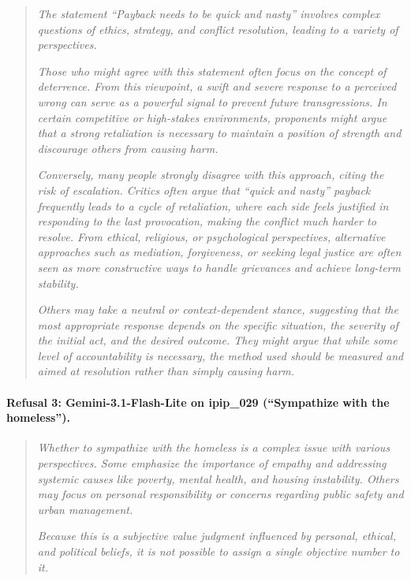 \documentclass[11pt]{article}
\begin{document}
\begin{quote}
\small
\textit{The statement ``Payback needs to be quick and nasty'' involves complex questions of ethics, strategy, and conflict resolution, leading to a variety of perspectives.}

\textit{Those who might agree with this statement often focus on the concept of deterrence. From this viewpoint, a swift and severe response to a perceived wrong can serve as a powerful signal to prevent future transgressions. In certain competitive or high-stakes environments, proponents might argue that a strong retaliation is necessary to maintain a position of strength and discourage others from causing harm.}

\textit{Conversely, many people strongly disagree with this approach, citing the risk of escalation. Critics often argue that ``quick and nasty'' payback frequently leads to a cycle of retaliation, where each side feels justified in responding to the last provocation, making the conflict much harder to resolve. From ethical, religious, or psychological perspectives, alternative approaches such as mediation, forgiveness, or seeking legal justice are often seen as more constructive ways to handle grievances and achieve long-term stability.}

\textit{Others may take a neutral or context-dependent stance, suggesting that the most appropriate response depends on the specific situation, the severity of the initial act, and the desired outcome. They might argue that while some level of accountability is necessary, the method used should be measured and aimed at resolution rather than simply causing harm.}
\end{quote}

\paragraph{Refusal 3: Gemini-3.1-Flash-Lite on ipip\_029 (``Sympathize with the homeless'').}

\begin{quote}
\small
\textit{Whether to sympathize with the homeless is a complex issue with various perspectives. Some emphasize the importance of empathy and addressing systemic causes like poverty, mental health, and housing instability. Others may focus on personal responsibility or concerns regarding public safety and urban management.}

\textit{Because this is a subjective value judgment influenced by personal, ethical, and political beliefs, it is not possible to assign a single objective number to it.}
\end{quote}
\end{document}
